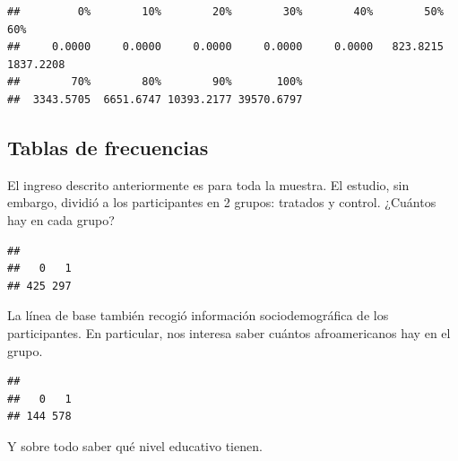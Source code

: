 \documentclass[
]{article}
\newenvironment{Shaded}{\begin{snugshade}}{\end{snugshade}}
\newcommand{\FunctionTok}[1]{\textcolor[rgb]{0.00,0.00,0.00}{#1}}
\newcommand{\NormalTok}[1]{#1}
\newcommand{\SpecialCharTok}[1]{\textcolor[rgb]{0.00,0.00,0.00}{#1}}
\begin{document}
\begin{verbatim}
##         0%        10%        20%        30%        40%        50%        60% 
##     0.0000     0.0000     0.0000     0.0000     0.0000   823.8215  1837.2208 
##        70%        80%        90%       100% 
##  3343.5705  6651.6747 10393.2177 39570.6797
\end{verbatim}

\hypertarget{tablas-de-frecuencias}{%
\subsection{Tablas de frecuencias}\label{tablas-de-frecuencias}}

El ingreso descrito anteriormente es para toda la muestra. El estudio,
sin embargo, dividió a los participantes en 2 grupos: tratados y
control. ¿Cuántos hay en cada grupo?

\begin{Shaded}
\end{Shaded}

\begin{verbatim}
## 
##   0   1 
## 425 297
\end{verbatim}

La línea de base también recogió información sociodemográfica de los
participantes. En particular, nos interesa saber cuántos afroamericanos
hay en el grupo.

\begin{Shaded}
\end{Shaded}

\begin{verbatim}
## 
##   0   1 
## 144 578
\end{verbatim}

Y sobre todo saber qué nivel educativo tienen.

\begin{Shaded}
\end{Shaded}
\end{document}
